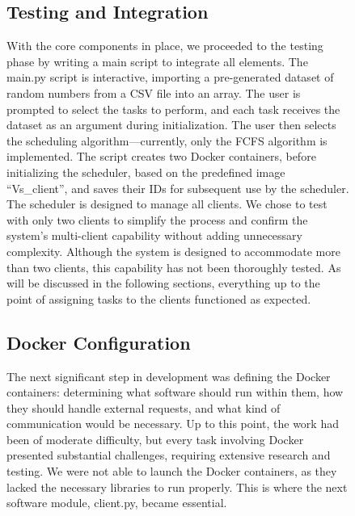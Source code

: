 \documentclass{article}
\begin{document}
\begin{figure}[h!]
\subsection{Testing and Integration}
With the core components in place, we proceeded to the testing phase by writing a main script to integrate all elements. The main.py script is interactive, importing a pre-generated dataset of random numbers from a CSV file into an array. The user is prompted to select the tasks to perform, and each task receives the dataset as an argument during initialization. The user then selects the scheduling algorithm—currently, only the FCFS algorithm is implemented. The script creates two Docker containers, before initializing the scheduler, based on the predefined image “Vs\_client”, and saves their IDs for subsequent use by the scheduler. The scheduler is designed to manage all clients. We chose to test with only two clients to simplify the process and confirm the system’s multi-client capability without adding unnecessary complexity. Although the system is designed to accommodate more than two clients, this capability has not been thoroughly tested. As will be discussed in the following sections, everything up to the point of assigning tasks to the clients functioned as expected.

\subsection{Docker Configuration}
The next significant step in development was defining the Docker containers: determining what software should run within them, how they should handle external requests, and what kind of communication would be necessary. Up to this point, the work had been of moderate difficulty, but every task involving Docker presented substantial challenges, requiring extensive research and testing. We were not able to launch the Docker containers, as they lacked the necessary libraries to run properly. This is where the next software module, client.py, became essential.


\end{figure}
\end{document}
